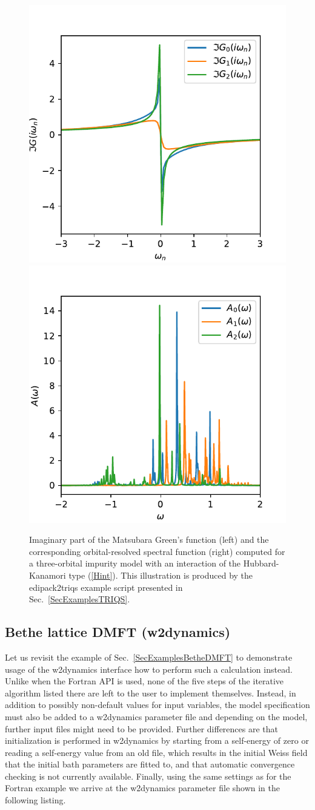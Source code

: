 \documentclass[edipack2.tex]{subfiles}
\begin{document}
\begin{figure}[t!]
    \includegraphics[width=0.5\linewidth]
        {edipack2_examples/edipack2triqs/G_iw.pdf}
    \includegraphics[width=0.5\linewidth]
        {edipack2_examples/edipack2triqs/A_w.pdf}
    \caption{\label{figEx3}%
        Imaginary part of the Matsubara Green's function (left) and the
        corresponding orbital-resolved spectral function (right) computed for a
        three-orbital impurity model with an interaction of the Hubbard-Kanamori
        type (\ref{Hint}). This illustration is produced by the edipack2triqs
        example script presented in Sec.~\ref{SecExamplesTRIQS}.
    }
\end{figure}

\subsection{Bethe lattice DMFT (w2dynamics)}\label{SecExamplesBetheDMFTw2d}
Let us revisit the example of Sec.~\ref{SecExamplesBetheDMFT} to
demonstrate usage of the w2dynamics interface how to perform such a
calculation instead. Unlike when the Fortran API is used, none of the
five steps of the iterative algorithm listed there are left to the
user to implement themselves. Instead, in addition to possibly
non-default values for \NAME input variables, the model specification
must also be added to a w2dynamics parameter file and depending on the
model, further input files might need to be provided. Further
differences are that initialization is performed in w2dynamics by
starting from a self-energy of zero or reading a self-energy value
from an old file, which results in the initial Weiss field that the
initial bath parameters are fitted to, and that automatic convergence
checking is not currently available. Finally, using the same settings
as for the Fortran example we arrive at the w2dynamics parameter file
shown in the following listing.
\end{document}
